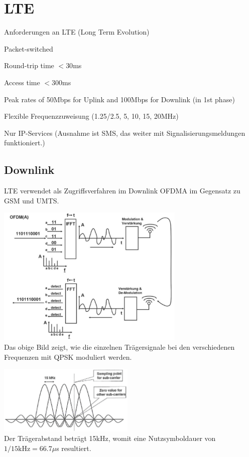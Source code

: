 \section{LTE }
    Anforderungen an LTE (Long Term Evolution)
	\begin{liste}
        \item Packet-switched
        \item Round-trip time $< 30$ms
        \item Access time $< 300$ms
        \item Peak rates of 50Mbps for Uplink and 100Mbps for Downlink (in 1st phase)
        \item Flexible Frequenzzuweisung (1.25/2.5, 5, 10, 15, 20MHz)
		\item Nur IP-Services (Ausnahme ist SMS, das weiter mit Signalisierungsmeldungen funktioniert.)
    \end{liste}
	
\subsection{Downlink}
	LTE verwendet als Zugriffsverfahren im Downlink OFDMA im Gegensatz zu GSM und UMTS.

	\begin{minipage}{9cm}        
        \includegraphics[width=9cm]{./bilder/systems-lte-ofdma.png} \\
        Das obige Bild zeigt, wie die einzelnen Trägersignale bei den verschiedenen Frequenzen mit QPSK moduliert werden.
    \end{minipage}
	\begin{minipage}{0.5cm}        
        \quad
    \end{minipage}
    \begin{minipage}{6.5cm}
		\includegraphics[width=6.5cm]{./bilder/systems-lte-qpsk.png} \\
		Der Trägerabstand beträgt 15kHz, womit eine Nutzsymboldauer von $1/15\text{kHz}=66.7\mu$s resultiert.
	\end{minipage}
	
